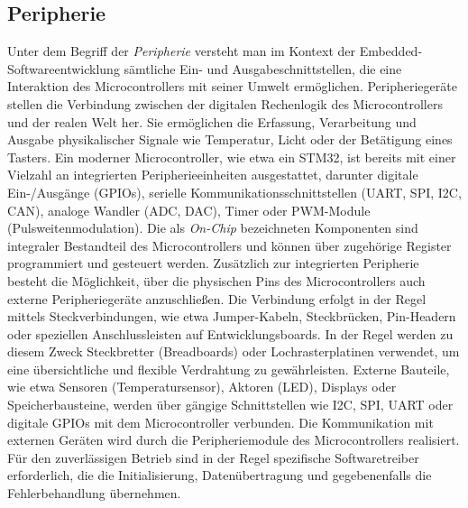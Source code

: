 \subsection{Peripherie}
Unter dem Begriff der \emph{Peripherie} versteht man im Kontext der Embedded-Softwareentwicklung sämtliche Ein- und Ausgabeschnittstellen, die eine Interaktion des Microcontrollers mit seiner Umwelt ermöglichen.
Peripheriegeräte stellen die Verbindung zwischen der digitalen Rechenlogik des Microcontrollers und der realen Welt her.
Sie ermöglichen die Erfassung, Verarbeitung und Ausgabe physikalischer Signale wie Temperatur, Licht oder der Betätigung eines Tasters.
Ein moderner Microcontroller, wie etwa ein STM32, ist bereits mit einer Vielzahl an integrierten Peripherieeinheiten ausgestattet, darunter digitale Ein-/Ausgänge (GPIOs), serielle Kommunikationsschnittstellen (UART, SPI, I2C, CAN), analoge Wandler (ADC, DAC), Timer oder PWM-Module (Pulsweitenmodulation). 
Die als \emph{On-Chip} bezeichneten Komponenten sind integraler Bestandteil des Microcontrollers und können über zugehörige Register programmiert und gesteuert werden.
Zusätzlich zur integrierten Peripherie besteht die Möglichkeit, über die physischen Pins des Microcontrollers auch externe Peripheriegeräte anzuschließen. 
Die Verbindung erfolgt in der Regel mittels Steckverbindungen, wie etwa Jumper-Kabeln, Steckbrücken, Pin-Headern oder speziellen Anschlussleisten auf Entwicklungsboards. 
In der Regel werden zu diesem Zweck Steckbretter (Breadboards) oder Lochrasterplatinen verwendet, um eine übersichtliche und flexible Verdrahtung zu gewährleisten. 
Externe Bauteile, wie etwa Sensoren (Temperatursensor), Aktoren (LED), Displays oder Speicherbausteine, werden über gängige Schnittstellen wie I2C, SPI, UART oder digitale GPIOs mit dem Microcontroller verbunden.
Die Kommunikation mit externen Geräten wird durch die Peripheriemodule des Microcontrollers realisiert. 
Für den zuverlässigen Betrieb sind in der Regel spezifische Softwaretreiber erforderlich, die die Initialisierung, Datenübertragung und gegebenenfalls die Fehlerbehandlung übernehmen.

